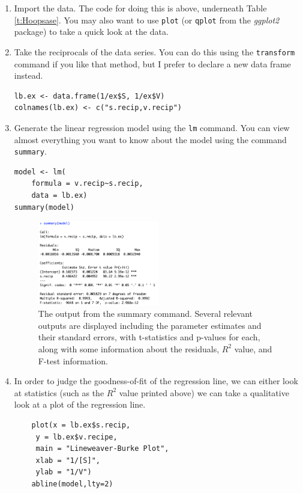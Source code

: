 \documentclass[11pt]{article}
\begin{document}
\begin{enumerate}

	\item Import the data. The code for doing this is above, underneath Table \ref{t:Hoopsase}. You may also want to use \texttt{plot} (or \texttt{qplot} from the {\it ggplot2} package) to take a quick look at the data.
	\item Take the reciprocals of the data series. You can do this using the \texttt{transform} command if you like that method, but I prefer to declare a new data frame instead.
		\begin{lstlisting}
lb.ex <- data.frame(1/ex$S, 1/ex$V)
colnames(lb.ex) <- c("s.recip,v.recip")
		\end{lstlisting}
	\item Generate the linear regression model using the \texttt{lm} command. You can view almost everything you want to know about the model using the command \texttt{summary}.
	\begin{lstlisting}
model <- lm(
	formula = v.recip~s.recip,
	data = lb.ex)
summary(model)
	\end{lstlisting}
	
	\begin{figure}[h!]
	\centering
	\includegraphics[width=0.5\textwidth]{output_ex_model.png}
	\caption{The output from the summary command. Several relevant outputs are displayed including the parameter estimates and their standard errors, with t-statistics and p-values for each, along with some information about the residuals, \(R^2\) value, and F-test information.}
	\end{figure}
	
	\item In order to judge the goodness-of-fit of the regression line, we can either look at statistics (such as the \(R^2\) value printed above) we can take a qualitative look at a plot of the regression line.
	
	\begin{lstlisting}
	plot(x = lb.ex$s.recip,
     y = lb.ex$v.recipe,
     main = "Lineweaver-Burke Plot",
     xlab = "1/[S]",
     ylab = "1/V")
	abline(model,lty=2)
	\end{lstlisting}
	

\end{enumerate}
\end{document}
